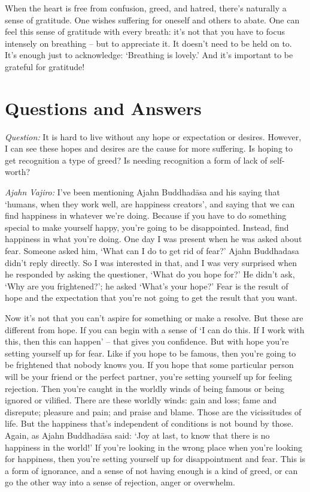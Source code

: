 When the heart is free from confusion, greed, and hatred, there's naturally a
sense of gratitude. One wishes suffering for oneself and others to abate. One
can feel this sense of gratitude with every breath: it's not that you have to
focus intensely on breathing -- but to appreciate it. It doesn't need to be held
on to. It's enough just to acknowledge: `Breathing is lovely.' And it's
important to be grateful for gratitude!

\section{Questions and Answers}

\emph{Question:} It is hard to live without any hope or expectation or desires.
However, I can see these hopes and desires are the cause for more suffering. Is
hoping to get recognition a type of greed? Is needing recognition a form of lack
of self-worth?

\enlargethispage{2\baselineskip}

\emph{Ajahn Vajiro:} I've been mentioning Ajahn Buddhadāsa and his saying that `humans,
when they work well, are happiness creators', and saying that we can find
happiness in whatever we're doing. Because if you have to do something special
to make yourself happy, you're going to be disappointed. Instead, find happiness
in what you're doing. One day I was present when he was asked about fear.
Someone asked him, `What can I do to get rid of fear?' Ajahn Buddhadasa didn't
reply directly. So I was interested in that, and I was very surprised when he
responded by asking the questioner, `What do you hope for?' He didn't ask, `Why
are you frightened?'; he asked `What's your hope?' Fear is the result of hope and
the expectation that you're not going to get the result that you want.

\enlargethispage{2\baselineskip}

Now it's not that you can't aspire for something or make a resolve. But these
are different from hope. If you can begin with a sense of `I can do this. If I
work with this, then this can happen' -- that gives you confidence. But with
hope you're setting yourself up for fear. Like if you hope to be famous, then
you're going to be frightened that nobody knows you. If you hope that some
particular person will be your friend or the perfect partner, you're setting
yourself up for feeling rejection. Then you're caught in the worldly winds of
being famous or being ignored or vilified. There are these worldly winds: gain
and loss; fame and disrepute; pleasure and pain; and praise and blame. Those are
the vicissitudes of life. But the happiness that's independent of conditions is
not bound by those. Again, as Ajahn Buddhadāsa said: `Joy at last, to know that
there is no happiness in the world!' If you're looking in the wrong place when
you're looking for happiness, then you're setting yourself up for disappointment
and fear. This is a form of ignorance, and a sense of not having enough is a
kind of greed, or can go the other way into a sense of rejection, anger or
overwhelm.

